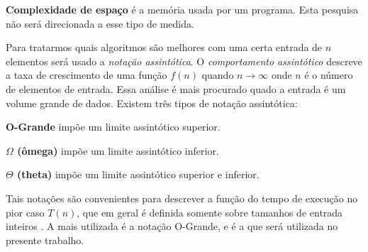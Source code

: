 \textbf{Complexidade de espaço} é a memória usada por um programa. Esta pesquisa não será direcionada a esse tipo de medida. 

Para tratarmos quais algoritmos são melhores com uma certa entrada de $n$ elementos
será usado a \emph{notação assintótica}. O \emph{comportamento assintótico} descreve a taxa de crescimento de uma função
$f(n)$ quando $n \rightarrow \infty$ onde $n$ é o número de elementos de entrada. Essa análise é mais procurado quado a entrada é um volume grande
de dados.
Existem três tipos de notação assintótica:

\textbf{O-Grande} impõe um limite assintótico superior.

\textbf{$\Omega$ (ômega)} impõe um limite assintótico inferior.

\textbf{$\Theta$ (theta)} impõe um limite assintótico superior e inferior.

Tais notações são convenientes para descrever a função do tempo de execução no
pior caso $T(n)$, que em geral é definida somente sobre tamanhos de entrada inteiros \cite{cormen}.
A mais utilizada é a notação O-Grande, e é a que será utilizada no presente trabalho.
